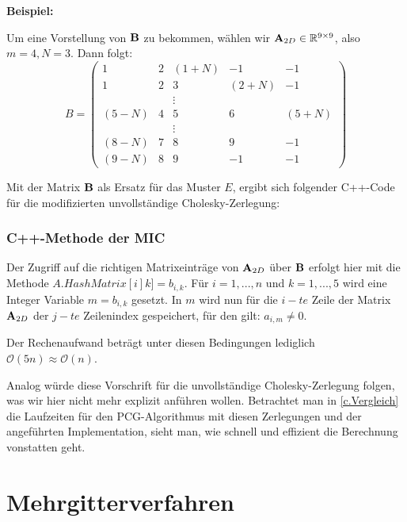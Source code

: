 \textbf{Beispiel:}

Um eine Vorstellung von ${\textbf{B}}$ zu bekommen, wählen wir ${\textbf{A}}_{2D} \in \mathbb{R}^{9 \times 9}$, also $m = 4, N = 3$. Dann folgt:
\begin{equation}
B = 
\begin{pmatrix}
1 & 2 & (1+N) & -1 & -1\\
1 & 2 & 3 & (2+N) & -1\\
  &   & \vdots & &\\
(5-N) & 4 & 5 & 6 & (5+N)\\
  &   & \vdots & &\\
(8-N) & 7 & 8 & 9 & -1\\
(9-N) & 8 & 9 & -1 & -1
\end{pmatrix}
\end{equation}

Mit der Matrix ${\textbf{B}}$ als Ersatz für das Muster $E$, ergibt sich folgender C++-Code für die modifizierten unvollständige Cholesky-Zerlegung:

\subsection{C++-Methode der MIC}\label{s.MIC}

Der Zugriff auf die richtigen Matrixeinträge von ${\textbf{A}}_{2D}$ über ${\textbf{B}}$ erfolgt hier mit die Methode $A.HashMatrix[i]k] = b_{i,k}$. Für $i = 1,...,n$ und $k = 1,...,5$ wird eine Integer Variable $m = b_{i,k}$ gesetzt. In $m$ wird nun für die $i - te$ Zeile der Matrix ${\textbf{A}}_{2D}$ der $j - te$ Zeilenindex gespeichert, für den gilt: $a_{i,m} \ne 0$.

Der Rechenaufwand beträgt unter diesen Bedingungen lediglich $\mathcal{O}(5n) \approx \mathcal{O}(n)$.

Analog würde diese Vorschrift für die unvollständige Cholesky-Zerlegung folgen, was wir hier nicht mehr explizit anführen wollen. Betrachtet man in \autoref{c.Vergleich} die Laufzeiten für den PCG-Algorithmus mit diesen Zerlegungen und der angeführten Implementation, sieht man, wie schnell und effizient die Berechnung vonstatten geht.

\chapter{Mehrgitterverfahren}\label{c.Mehrgitterverfahren}

